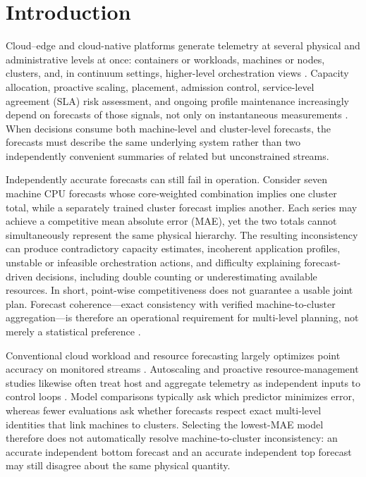 \documentclass[a4paper,fleqn]{cas-dc}
\begin{document}
\section{Introduction}
\label{sec:introduction}

Cloud--edge and cloud-native platforms generate telemetry at several physical
and administrative levels at once: containers or workloads, machines or nodes,
clusters, and, in continuum settings, higher-level orchestration views
\cite{buyya2019manifesto,shi2016edge,satyanarayanan2017emergence}.
Capacity allocation, proactive scaling, placement, admission control,
service-level agreement ({SLA}) risk assessment, and ongoing profile maintenance
increasingly depend on forecasts of those signals, not only on instantaneous
measurements
\cite{lorido2014review,qu2018auto}.
When decisions consume both machine-level and cluster-level forecasts, the
forecasts must describe the same underlying system rather than two
independently convenient summaries of related but unconstrained streams.

Independently accurate forecasts can still fail in operation.
Consider seven machine {CPU} forecasts whose core-weighted combination implies
one cluster total, while a separately trained cluster forecast implies another.
Each series may achieve a competitive mean absolute error ({MAE}), yet the two
totals cannot simultaneously represent the same physical hierarchy.
The resulting inconsistency can produce contradictory capacity estimates,
incoherent application profiles, unstable or infeasible orchestration actions,
and difficulty explaining forecast-driven decisions, including double counting
or underestimating available resources.
In short, point-wise competitiveness does not guarantee a usable joint plan.
Forecast coherence---exact consistency with verified machine-to-cluster
aggregation---is therefore an operational requirement for multi-level planning,
not merely a statistical preference
\cite{hyndman2011optimal,athanasopoulos2024hierarchical}.

Conventional cloud workload and resource forecasting largely optimizes point
accuracy on monitored streams
\cite{calheiros2015workload,masdari2020workload,khan2022workload}.
Autoscaling and proactive resource-management studies likewise often treat host
and aggregate telemetry as independent inputs to control loops
\cite{toka2021kubernetes,casalicchio2019container}.
Model comparisons typically ask which predictor minimizes error, whereas fewer
evaluations ask whether forecasts respect exact multi-level identities that
link machines to clusters.
Selecting the lowest-{MAE} model therefore does not automatically resolve
machine-to-cluster inconsistency: an accurate independent bottom forecast and
an accurate independent top forecast may still disagree about the same physical
quantity.
\end{document}
